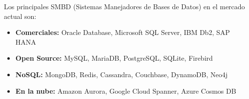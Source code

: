 Los principales SMBD (Sistemas Manejadores de Bases de Datos) en el mercado actual son:

\begin{itemize}
    \item \textbf{Comerciales:} Oracle Database, Microsoft SQL Server, IBM Db2, SAP HANA
    \item \textbf{Open Source:} MySQL, MariaDB, PostgreSQL, SQLite, Firebird
    \item \textbf{NoSQL:} MongoDB, Redis, Cassandra, Couchbase, DynamoDB, Neo4j
    \item \textbf{En la nube:} Amazon Aurora, Google Cloud Spanner, Azure Cosmos DB
\end{itemize}
